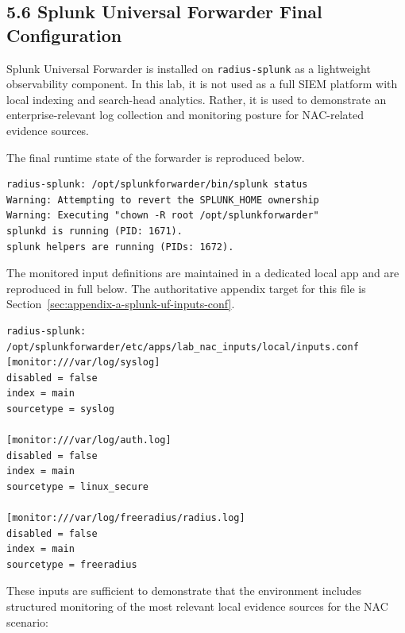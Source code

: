 \documentclass[11pt]{article}
\begin{document}

\subsection{5.6 Splunk Universal Forwarder Final Configuration}
\label{sec:splunk-universal-forwarder-final-configuration}

Splunk Universal Forwarder is installed on \texttt{radius-splunk} as a lightweight observability component. In this lab, it is not used as a full SIEM platform with local indexing and search-head analytics. Rather, it is used to demonstrate an enterprise-relevant log collection and monitoring posture for NAC-related evidence sources.

The final runtime state of the forwarder is reproduced below.

\begin{verbatim}
radius-splunk: /opt/splunkforwarder/bin/splunk status
Warning: Attempting to revert the SPLUNK_HOME ownership
Warning: Executing "chown -R root /opt/splunkforwarder"
splunkd is running (PID: 1671).
splunk helpers are running (PIDs: 1672).
\end{verbatim}

The monitored input definitions are maintained in a dedicated local app and are reproduced in full below. The authoritative appendix target for this file is Section~\ref{sec:appendix-a-splunk-uf-inputs-conf}.

\begin{verbatim}
radius-splunk: /opt/splunkforwarder/etc/apps/lab_nac_inputs/local/inputs.conf
[monitor:///var/log/syslog]
disabled = false
index = main
sourcetype = syslog

[monitor:///var/log/auth.log]
disabled = false
index = main
sourcetype = linux_secure

[monitor:///var/log/freeradius/radius.log]
disabled = false
index = main
sourcetype = freeradius
\end{verbatim}

These inputs are sufficient to demonstrate that the environment includes structured monitoring of the most relevant local evidence sources for the NAC scenario:
\end{document}
